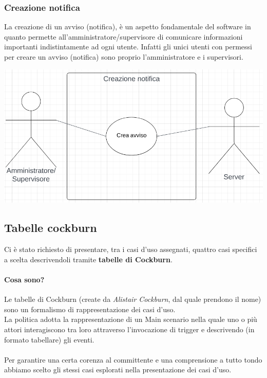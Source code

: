 \subsubsection{Creazione notifica}
La creazione di un avviso (notifica), è un aspetto fondamentale del software in quanto permette all'amministratore/supervisore di comunicare informazioni importanti indistintamente ad ogni utente. Infatti gli unici utenti con permessi per creare un avviso (notifica) sono proprio l'amministratore e i supervisori.
\begin{center}
  \includegraphics[scale=0.6]{img/use_case/use_case-creazione_notifica.png}
\end{center}
\newpage
\subsection{Tabelle cockburn}
Ci è stato richiesto di presentare, tra i casi d'uso assegnati, quattro casi
specifici a scelta descrivendoli tramite \textbf{tabelle di Cockburn}.
\paragraph{Cosa sono?} Le tabelle di Cockburn (create da \textit{Alistair Cockburn}, dal quale prendono il nome) sono un formalismo di rappresentazione dei casi d'uso.\\
La politica adotta la rappresentazione di un Main scenario nella quale uno o più attori interagiscono
tra loro attraverso l'invocazione di trigger e descrivendo (in formato tabellare) gli eventi.
\\
\\Per garantire una certa corenza al committente e una comprensione a tutto tondo abbiamo scelto gli stessi casi esplorati nella presentazione dei casi d'uso.
